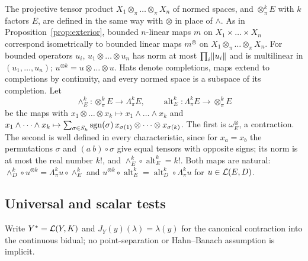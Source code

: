The projective tensor product $X_1\otimes_\pi\dots\otimes_\pi X_n$ of normed spaces, and $\otimes^k_\pi E$ with $k$
factors $E$, are defined in the same way with $\otimes$ in place of $\wedge$. As in Proposition~\ref{prop:exterior},
bounded $n$-linear maps $m$ on $X_1\times\dots\times X_n$ correspond isometrically to bounded linear maps $m^\otimes$ on
$X_1\otimes_\pi\dots\otimes_\pi X_n$. For bounded operators $u_i$, $u_1\otimes\dots\otimes u_n$ has norm at most
$\prod_i\lVert u_i\rVert$ and is multilinear in $(u_1,\dots,u_n)$; $u^{\otimes k}=u\otimes\dots\otimes u$. Hats denote
completions, maps extend to completions by continuity, and every normed space is a subspace of its completion. Let
\[
 \wedge^k_E\colon\otimes^k_\pi E\to\Lambda^k_\pi E,\qquad
 \operatorname{alt}^k_E\colon\Lambda^k_\pi E\to\otimes^k_\pi E
\]
be the maps with $x_1\otimes\dots\otimes x_k\mapsto x_1\wedge\dots\wedge x_k$ and
$x_1\wedge\dots\wedge x_k\mapsto\sum_{\sigma\in S_k}\operatorname{sgn}(\sigma)\,x_{\sigma(1)}\otimes\dots\otimes x_{\sigma(k)}$. The first is
$\omega_E^\otimes$, a contraction. The second is well defined in every characteristic, since for $x_a=x_b$ the
permutations $\sigma$ and $(a\ b)\circ\sigma$ give equal tensors with opposite signs; its norm is at most the real number
$k!$, and $\wedge^k_E\circ\operatorname{alt}^k_E=k!$. Both maps are natural:
$\wedge^k_D\circ u^{\otimes k}=\Lambda^k_\pi u\circ\wedge^k_E$ and
$u^{\otimes k}\circ\operatorname{alt}^k_E=\operatorname{alt}^k_D\circ\Lambda^k_\pi u$ for $u\in\mathcal L(E,D)$.

\subsection{Universal and scalar tests}\label{ob:ssec:tests}

Write $Y^*=\mathcal L(Y,K)$ and $J_Y(y)(\lambda)=\lambda(y)$ for the canonical contraction into the continuous bidual; no
point-separation or Hahn--Banach assumption is implicit.


